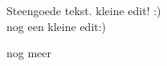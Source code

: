 \documentclass[10pt]{report}
\begin{document}
Steengoede tekst.
kleine edit! :)\\
nog een kleine edit:)


nog meer
\end{document}
